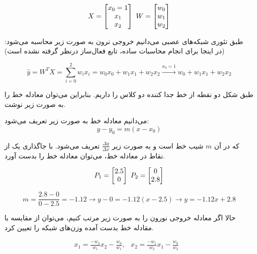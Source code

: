 \begin{enumerate}
\begin{qsolve}
		$$
			X=\begin{bmatrix}          
				x_0=1\\
				x_1\\
				x_2
				
				\end{bmatrix} \\\       W=\begin{bmatrix}          
												w_0\\
												w_1\\
												w_2
											
											\end{bmatrix}
		$$
		
		طبق تئوری شبکه‌های عصبی می‌دانیم خروجی نرون به صورت زیر محاسبه می‌شود: (در اینجا برای انجام محاسبات ساده، تابع فعال‌ساز درنظر گرفته نشده است)
		
		$$
			\hat{y}=W^T X = \sum_{i=0}^{2} {w_ix_i}=w_0x_0+w_1x_1+w_2x_2 \xrightarrow{x_0=1} w_0+w_1x_1+w_2x_2
		$$
		
		طبق شکل  دو نقطه از خط جدا کننده دو کلاس را داریم. بنابراین می‌توان معادله خط را به صورت زیر نوشت.
		
		می‌دانیم معادله خط به صورت زیر تعریف می‌شود:
		$$
			y-y_0=m(x-x_0)
		$$
		
		که در آن $m$ شیب خط است و به صورت زیر $\frac{\Delta y}{\Delta x}$ تعریف می‌شود. با جاگذاری یک از نقاط در معادله خط، می‌توان معادله خط را بدست آورد.
		
		$$
			P_1=\begin{bmatrix}          
				2.5\\
				0
				
			\end{bmatrix} \\\       P_2=\begin{bmatrix}          
				0\\
				2.8
				
			\end{bmatrix}
		$$
		
		$$
			m=\frac{2.8-0}{0-2.5}=-1.12 \rightarrow y-0=-1.12(x-2.5) \rightarrow \boxed{y=-1.12x+2.8}
		$$
		
		حالا اگر معادله خروجی نورون را به صورت زیر مرتب کنیم، می‌توان از مقایسه با مقادله خط بدست آمده وزن‌های شبکه را تعیین کرد.
		
		\begin{eqnarray*}
			x_1=\frac{-w_2}{w_1}x_2-\frac{w_0}{w_1},
			&x_2=\frac{-w_1}{w_2}x_1-\frac{w_0}{w_2}&
		\end{eqnarray*}


\end{qsolve}
\end{enumerate}
